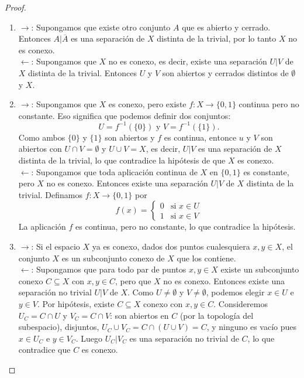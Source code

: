 \begin{proof}
    \begin{enumerate}
        \item $\rightarrow$: Supongamos que existe otro conjunto $A$ que es abierto y cerrado. Entonces $A|\overline{A}$ es una separación de $X$ distinta de la trivial, por lo tanto $X$ no es conexo. \\ 
        $\leftarrow$: Supongamos que $X$ no es conexo, es decir, existe una separación $U|V$ de $X$ distinta de la trivial. Entonces $U$ y $V$ son abiertos y cerrados distintos de $\emptyset$ y $X$.
        \item $\rightarrow$: Supongamos que $X$ es conexo, pero existe $f: X \to \{0, 1\}$ continua pero no constante. Eso significa que podemos definir dos conjuntos: 
    $$U = f^{-1}(\{0\}) \text{ y } V = f^{-1}(\{1\}).$$
    Como ambos $\{0\}$ y $\{1\}$ son abiertos y $f$ es continua, entonce $u$ y $V$ son abiertos con $U \cap V = \emptyset$ y $U \cup V = X$, es decir, $U|V$ es una separación de $X$ distinta de la trivial, lo que contradice la hipótesis de que $X$ es conexo. \\
    $\leftarrow$: Supongamos que toda aplicación continua de $X$ en $\{0, 1\}$ es constante, pero $X$ no es conexo. Entonces existe una separación $U|V$ de $X$ distinta de la trivial. Definamos $f: X \to \{0, 1\}$ por $$f(x) = \begin{cases} 0 & \text{si } x \in U \\ 1 & \text{si } x \in V \end{cases}$$
    La aplicación $f$ es continua, pero no constante, lo que contradice la hipótesis.
    \item $\rightarrow$: Si el espacio $X$ ya es conexo, dados dos puntos cualesquiera $x, y \in X$, el conjunto $X$ es un subconjunto conexo de $X$ que los contiene. \\
    $\leftarrow$: Supongamos que para todo par de puntos $x, y \in X$ existe un subconjunto conexo $C \subseteq X$ con $x, y \in C$, pero que $X$ no es conexo. Entonces existe una separación no trivial $U|V$ de $X$. Como $U \neq \emptyset$ y $V \neq \emptyset$, podemos elegir $x \in U$ e $y \in V$. Por hipótesis, existe $C \subseteq X$ conexo con $x, y \in C$. Consideremos $U_C = C \cap U$ y $V_C = C \cap V$: son abiertos en $C$ (por la topología del subespacio), disjuntos, $U_C \cup V_C = C \cap (U \cup V) = C$, y ninguno es vacío pues $x \in U_C$ e $y \in V_C$. Luego $U_C|V_C$ es una separación no trivial de $C$, lo que contradice que $C$ es conexo.
    \end{enumerate}
\end{proof}
